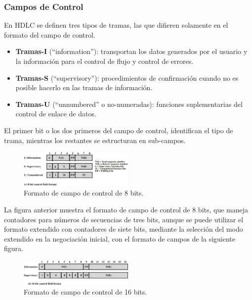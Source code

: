 \documentclass[withindex,glossary]{cam-thesis}
\begin{document}
\subsubsection{Campos de Control}
En HDLC se definen tres tipos de tramas, las que difieren solamente en el formato del campo de control.
\begin{itemize}
\item \textbf{Tramas-I} (“information”): transportan los datos generados por el usuario y la información para el control de flujo y control de errores.
\item \textbf{Tramas-S} (“supervisory”): procedimientos de confirmación cuando no es posible hacerlo en las tramas de información.
\item \textbf{Tramas-U} (“unnumbered” o no-numeradas): funciones suplementarias del control de enlace de datos.
\end{itemize}

El primer bit o los dos primeros del campo de control, identifican el tipo de trama, mientras los restantes se estructuran en sub-campos.

\begin{figure}[H]
\centering
\includegraphics[width=0.5\textwidth]{images/HDLC_8BitCtrlField}
\caption[Formato de campo de control de 8 bits]{Formato de campo de control de 8 bits.}
\end{figure}

La figura anterior muestra el formato de campo de control de 8 bits, que maneja contadores para números de secuencias de tres bits, aunque se puede utilizar el formato extendido con contadores de siete bits, mediante la selección del modo extendido en la negociación inicial, con el formato de campos de la siguiente figura.

\begin{figure}[H]
\centering
\includegraphics[width=0.5\textwidth]{images/HDLC_16BitCtrlField}
\caption[Formato de campo de control de 16 bits]{Formato de campo de control de 16 bits.}
\end{figure}
\end{document}
